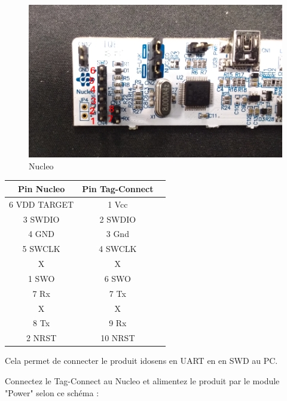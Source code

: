 \documentclass{article}
\begin{document}
\begin{figure}[H]
\begin{center}
\advance\leftskip-3cm
\advance\rightskip-3cm
\includegraphics[keepaspectratio=true,scale=0.3]{Nucleo_pins.png}
\caption{Nucleo}
\label{visina8}
\end{center}\end{figure}


\begin{center}
 \begin{tabular}{||c | c | c ||} 
 \hline
 Pin Nucleo  & Pin Tag-Connect \\ [0.8ex] 
 \hline\hline
  6 VDD TARGET   &  1 Vcc \\ 
 \hline
   3 SWDIO & 2 SWDIO \\
 \hline
  4 GND  & 3 Gnd\\
 \hline
  5 SWCLK  &  4 SWCLK\\
 \hline
  X  & X \\ [1ex] 
 \hline
  1 SWO  & 6 SWO \\ [1ex]
 \hline
  7 Rx  & 7 Tx \\ [1ex] 
 \hline
  X  & X \\ [1ex] 
 \hline
 8 Tx & 9 Rx \\ [1ex] 
 \hline
 2 NRST & 10 NRST\\ [1ex] 
 \hline
\end{tabular}
\end{center}





Cela permet de connecter le produit idosens en UART en en SWD au PC.

Connectez le Tag-Connect au Nucleo et alimentez le produit par le module "Power" selon ce schéma :
\end{document}
